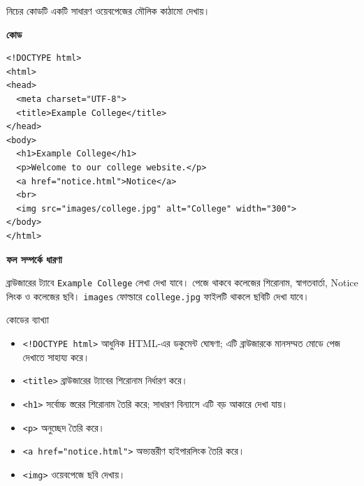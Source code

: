 নিচের কোডটি একটি সাধারণ ওয়েবপেজের মৌলিক কাঠামো দেখায়।

\par\noindent
\begin{minipage}[t]{.54\linewidth}\vspace{0pt}\small
\textbf{\color{chFourTeal}কোড}\par
\begin{verbatim}
<!DOCTYPE html>
<html>
<head>
  <meta charset="UTF-8">
  <title>Example College</title>
</head>
<body>
  <h1>Example College</h1>
  <p>Welcome to our college website.</p>
  <a href="notice.html">Notice</a>
  <br>
  <img src="images/college.jpg" alt="College" width="300">
</body>
</html>
\end{verbatim}
\par\smallskip
\end{minipage}\hfill
\begin{minipage}[t]{.42\linewidth}\vspace{0pt}\small
\textbf{\color{chFourTeal}ফল সম্পর্কে ধারণা}\par
ব্রাউজারের ট্যাবে \texttt{Example College} লেখা দেখা যাবে। পেজে থাকবে কলেজের শিরোনাম, স্বাগতবার্তা, Notice লিংক ও কলেজের ছবি। \texttt{images} ফোল্ডারে \texttt{college.jpg} ফাইলটি থাকলে ছবিটি দেখা যাবে।
\par\smallskip
\end{minipage}\par


\begin{keypointbox}{কোডের ব্যাখ্যা}
\par\noindent
\begin{minipage}[t]{.48\linewidth}\vspace{0pt}
\begin{itemize}
\item \texttt{<!DOCTYPE html>} আধুনিক HTML-এর ডকুমেন্ট ঘোষণা; এটি ব্রাউজারকে মানসম্মত মোডে পেজ দেখাতে সাহায্য করে।
\item \texttt{<title>} ব্রাউজারের ট্যাবের শিরোনাম নির্ধারণ করে।
\item \texttt{<h1>} সর্বোচ্চ স্তরের শিরোনাম তৈরি করে; সাধারণ বিন্যাসে এটি বড় আকারে দেখা যায়।
\end{itemize}
\end{minipage}\hfill
\begin{minipage}[t]{.48\linewidth}\vspace{0pt}
\begin{itemize}
\item \texttt{<p>} অনুচ্ছেদ তৈরি করে।
\item \texttt{<a href="notice.html">} অভ্যন্তরীণ হাইপারলিংক তৈরি করে।
\item \texttt{<img>} ওয়েবপেজে ছবি দেখায়।
\end{itemize}
\end{minipage}\par

\end{keypointbox}

